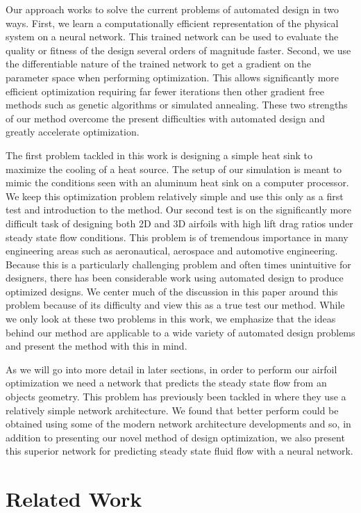\documentclass{article} %
\begin{document}
Our approach works to solve the current problems of automated design in two ways. First, we learn a computationally efficient representation of the physical system on a neural network. This trained network can be used to evaluate the quality or fitness of the design several orders of magnitude faster. Second, we use the differentiable nature of the trained network to get a gradient on the parameter space when performing optimization. This allows significantly more efficient optimization requiring far fewer iterations then other gradient free methods such as genetic algorithms or simulated annealing. These two strengths of our method overcome the present difficulties with automated design and greatly accelerate optimization.

The first problem tackled in this work is designing a simple heat sink to maximize the cooling of a heat source. The setup of our simulation is meant to mimic the conditions seen with an aluminum heat sink on a computer processor. We keep this optimization problem relatively simple and use this only as a first test and introduction to the method. Our second test is on the significantly more difficult task of designing both 2D and 3D airfoils with high lift drag ratios under steady state flow conditions. This problem is of tremendous importance in many engineering areas such as aeronautical, aerospace and automotive engineering. Because this is a particularly challenging problem and often times unintuitive for designers, there has been considerable work using automated design to produce optimized designs. We center much of the discussion in this paper around this problem because of its difficulty and view this as a true test our method. While we only look at these two problems in this work, we emphasize that the ideas behind our method are applicable to a wide variety of automated design problems and present the method with this in mind.

As we will go into more detail in later sections, in order to perform our airfoil optimization we need a network that predicts the steady state flow from an objects geometry. This problem has previously been tackled in \citet{guo2016convolutional} where they use a relatively simple network architecture. We found that better perform could be obtained using some of the modern network architecture developments and so, in addition to presenting our novel method of design optimization, we also present this superior network for predicting steady state fluid flow with a neural network.

\section{Related Work}
\end{document}
